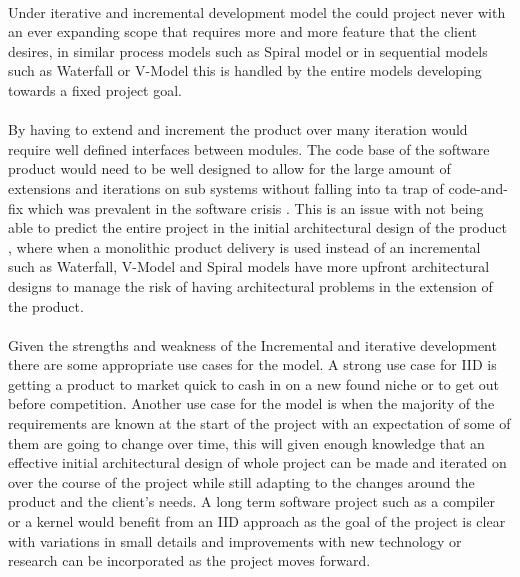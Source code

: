 \documentclass{style/CRPITStyle}
\renewcommand{\cite}{\citep}
\begin{document}
\paragraph{}
Under iterative and incremental development model the could project never with
an ever expanding scope that requires more and more feature that the client
desires, in similar process models such as Spiral model or in sequential models
such as Waterfall or V-Model this is handled by the entire models developing
towards a fixed project goal.

\paragraph{}
By having to extend and increment the product over many iteration would require
well defined interfaces between modules.
The code base of the software product would need to be well designed to 
allow for the large amount of extensions and iterations on sub systems without
falling into ta trap of code-and-fix which was prevalent in the software crisis
\cite{nato:1969}. This is an issue with not being able to predict the entire
project in the initial architectural design of the product \cite{sommerville:1996}, where when a monolithic
product delivery is used instead of an incremental such as Waterfall, V-Model and Spiral models 
have more upfront architectural designs to manage the risk of having
architectural problems in the extension of the product.

\paragraph{}
Given the strengths and weakness of the Incremental and iterative development
there are some appropriate use cases for the model. A strong use case for IID is
getting a product to market quick to cash in on a new found niche or to get out
before competition. Another use case for the model is when the majority of the
requirements are known at the start of the project with an expectation of some
of them are going to change over time, this will given enough knowledge 
that an effective initial architectural design of whole project can be made and
iterated on over the course of the project while still adapting to the changes
around the product and the client's needs. A long term software project such as
a compiler or a kernel would benefit from an IID approach as the goal of the
project is clear with variations in small details and improvements with new
technology or research can be incorporated as the project moves forward.
\end{document}
